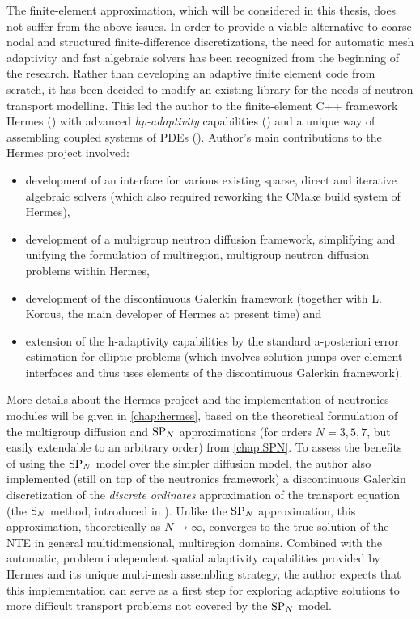 The finite-element approximation, which will be considered in this thesis, does not
suffer from the above issues.
In order to
provide a viable alternative to coarse nodal and structured finite-difference discretizations, the need for automatic
mesh adaptivity and fast algebraic solvers has been recognized from the beginning of the research. Rather than developing an
adaptive finite element code from scratch, it has been decided to modify an existing library for the needs of neutron transport
modelling. This led the author to the finite-element C++ framework Hermes (\cite{Hermes-project}) with advanced
\textit{hp-adaptivity} capabilities (\cite{Hermes-hanging-nodes}) and a unique way of assembling coupled systems of PDEs
(\cite{Hermes-thermoelasticity}).
Author's main contributions to the Hermes project involved:
\begin{itemize}
    \item development of an interface for various existing sparse,
direct and iterative algebraic solvers (which also required reworking the CMake build system of Hermes),
	\item development of a multigroup neutron diffusion framework, simplifying and unifying the formulation of
	multiregion, multigroup neutron diffusion problems within Hermes,
	\item development of the discontinuous Galerkin framework (together with L. Korous, the main developer of Hermes at
	present time) and
	\item extension of the h-adaptivity capabilities by the standard a-posteriori error estimation for elliptic problems (which
involves solution jumps over element interfaces and thus uses elements of the discontinuous Galerkin framework). 
\end{itemize}
More details about the Hermes project and the implementation of neutronics modules will be given in \cref{chap:hermes},
based on the theoretical formulation of the multigroup diffusion and $\text{SP}_{N}$ approximations (for orders $N = 3,5,7$,  but
easily extendable to an arbitrary order) from \cref{chap:SPN}. To assess the benefits of using the $\text{SP}_{N}$ model over the
simpler diffusion model, the author also implemented (still on top of the neutronics framework) a  discontinuous
Galerkin discretization of the \textit{discrete ordinates} approximation of the transport equation  (the $\text{S}_{N}$ method,
introduced in ). Unlike the $\text{SP}_{N}$ approximation, this
approximation, theoretically as $N\to\infty$, converges to the true solution of the NTE in general multidimensional,
multiregion domains. Combined with the automatic, problem independent spatial adaptivity capabilities provided by Hermes
and its unique multi-mesh assembling strategy, the author expects that this implementation can serve as a first step for
exploring adaptive solutions to more difficult transport problems not covered by the $\text{SP}_{N}$ model.

